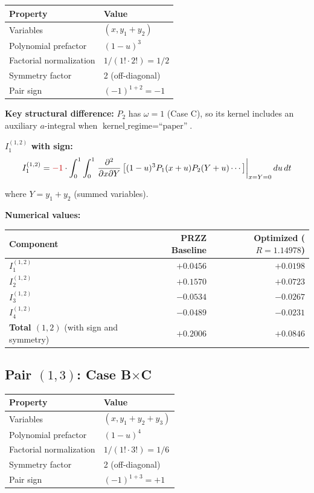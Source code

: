 \documentclass[11pt]{article}
\begin{document}
\begin{center}
\begin{tabular}{ll}
\toprule
Property & Value \\
\midrule
Variables & $(x, y_1+y_2)$ \\
Polynomial prefactor & $(1-u)^3$ \\
Factorial normalization & $1/(1! \cdot 2!) = 1/2$ \\
Symmetry factor & 2 (off-diagonal) \\
Pair sign & $(-1)^{1+2} = -1$ \\
\bottomrule
\end{tabular}
\end{center}

\textbf{Key structural difference:} $P_2$ has $\omega = 1$ (Case C), so its kernel includes an auxiliary $a$-integral when $\text{kernel\_regime} = \text{``paper''}$.

\textbf{$I_1^{(1,2)}$ with sign:}
\begin{equation}
I_1^{(1,2)} = \textcolor{signflip}{-1} \cdot \int_0^1 \int_0^1 \left.\frac{\partial^2}{\partial x \partial Y}\left[(1-u)^3 P_1(x+u) P_2(Y+u) \cdots\right]\right|_{x=Y=0} du\, dt
\end{equation}

where $Y = y_1 + y_2$ (summed variables).

\textbf{Numerical values:}

\begin{center}
\begin{tabular}{lrr}
\toprule
Component & PRZZ Baseline & Optimized ($R=1.14978$) \\
\midrule
$I_1^{(1,2)}$ & $+0.0456$ & $+0.0198$ \\
$I_2^{(1,2)}$ & $+0.1570$ & $+0.0723$ \\
$I_3^{(1,2)}$ & $-0.0534$ & $-0.0267$ \\
$I_4^{(1,2)}$ & $-0.0489$ & $-0.0231$ \\
\midrule
\textbf{Total $(1,2)$} (with sign and symmetry) & $+0.2006$ & $+0.0846$ \\
\bottomrule
\end{tabular}
\end{center}

\subsection{Pair $(1,3)$: Case B$\times$C}

\begin{center}
\begin{tabular}{ll}
\toprule
Property & Value \\
\midrule
Variables & $(x, y_1+y_2+y_3)$ \\
Polynomial prefactor & $(1-u)^4$ \\
Factorial normalization & $1/(1! \cdot 3!) = 1/6$ \\
Symmetry factor & 2 (off-diagonal) \\
Pair sign & $(-1)^{1+3} = +1$ \\
\bottomrule
\end{tabular}
\end{center}
\end{document}
